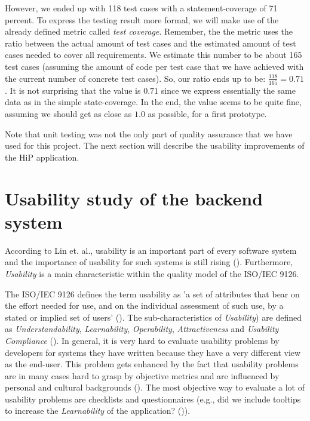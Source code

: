 However, we ended up with 118 test cases with a statement-coverage of 71 percent. To express the testing result more formal, we will make use of the already defined metric called \emph{test coverage}. Remember, the the metric  uses the ratio between the actual amount of test cases and the estimated amount of test cases needed to cover all requirements. We estimate this number to be about 165 test cases (assuming the amount of code per test case that we have achieved with the current number of concrete test cases). So, our ratio ends up to be: $\frac{118}{165}=0.71$. It is not surprising that the value is $0.71$ since we express essentially the same data as in the simple state-coverage. In the end, the value seems to be quite fine, assuming we should get as close as $1.0$ as possible, for a first prototype.

Note that unit testing was not the only part of quality assurance that we have used for this project. The next section will describe the usability improvements of the \ac{HiP} application.

\section{Usability study of the backend system}
According to Lin et. al., usability is an important part of every software system and the importance of usability for such systems is still rising (\cite{lin1997proposed}). Furthermore, \emph{Usability} is a main characteristic within the quality model of the ISO/IEC 9126.

The ISO/IEC 9126 defines the term usability as 'a set of attributes that bear on the effort needed for use, and on the individual assessment of such use, by a stated or implied set of users' (\cite{bevan1997quality}). The sub-characteristics of \emph{Usability}) are defined as \emph{Understandability}, \emph{Learnability}, \emph{Operability}, \emph{Attractiveness} and \emph{Usability Compliance} (\cite{bevan1997quality}). In general, it is very hard to evaluate usability problems by developers for systems they have written because they have a very different view as the end-user. This problem gets enhanced by the fact that usability problems are in many cases hard to grasp by objective metrics and are influenced by personal and cultural backgrounds (\cite{herman1996towards}). The most objective way to evaluate a lot of usability problems are checklists and questionnaires (e.g., did we include tooltips to increase the \emph{Learnability} of the application? (\cite{shamsuddin2014capturing})). 


